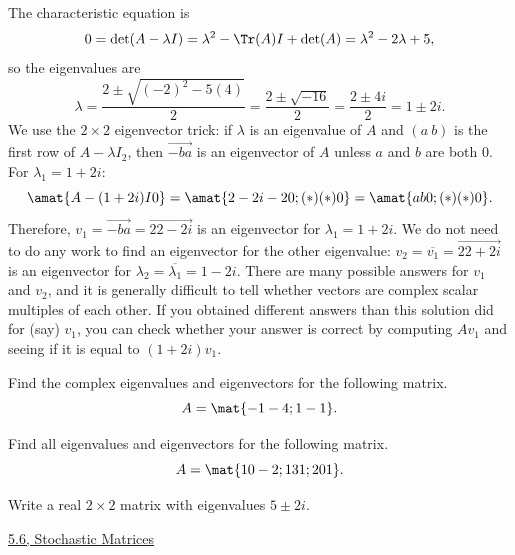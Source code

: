 \begin{problems}
\begin{solution}
The characteristic equation is
\[0 = \det(A-\lambda I) = \lambda^2 - \Tr(A) I + \det(A)
  = \lambda^2 - 2 \lambda + 5,\]
so the eigenvalues are
\[\lambda = \dfrac{2 \pm \sqrt{(-2)^2-5(4)}}{2}
  = \dfrac{2 \pm \sqrt{-16}}{2} = \dfrac{2 \pm 4i}{2} = 1 \pm 2i.\] %
We use the $2 \times 2$ eigenvector trick: if $\lambda$ is an eigenvalue of $A$
and $(a \ b)$ is the first row of $A-\lambda I_2$, then $\vec{-b a}$ is an
eigenvector of $A$ unless $a$ and $b$ are both $0$.  %
\newline %
For $\lambda_1 = 1 + 2i$:
\[\amat{A-(1+2i)I 0} = \amat{2-2i -2 0; (*) (*) 0} = \amat{a b 0; (*) (*) 0}.\]
Therefore, $v_1 = \vec{-b a} = \vec{2 2-2i}$ is an eigenvector for
$\lambda_1 = 1+2i$. \newline \newline %
We do not need to do any work to find an eigenvector for the other eigenvalue:
$v_2 = \overline{v_1} = \vec{2 2+2i}$ is an eigenvector for
$\lambda_2 = \overline{\lambda_1} = 1-2i$.  \newline \newline %
There are many possible answers for $v_1$ and $v_2$, and it is generally
difficult to tell whether vectors are complex scalar multiples of each other.
If you obtained different answers than this solution did for (say) $v_1$, you
can check whether your answer is correct by computing $Av_1$ and seeing if it is
equal to $(1+2i)v_1$.

\end{solution}

\problem %
Find the complex eigenvalues and eigenvectors for the following matrix.
\[A = \mat{-1 -4; 1 -1}.\]

\problem %
Find all eigenvalues and eigenvectors for the following matrix.
\[A = \mat{1 0 -2; 1 3 1; 2 0 1}.\]

\problem Write a real $2 \times 2$ matrix with eigenvalues $5 \pm 2i$.
\end{problems}\setcounter{problem}{0}

\newpage

\begin{center} \underline{5.6, Stochastic Matrices} \end{center}


